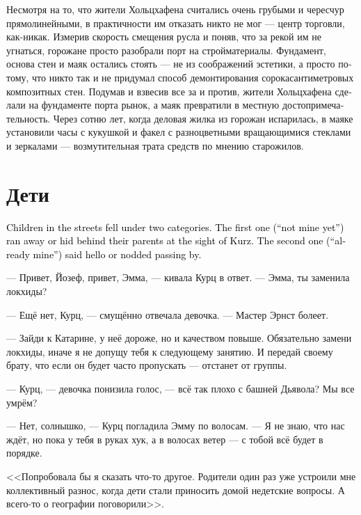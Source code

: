\documentclass[a4paper,12pt,fleqn]{book}\usepackage{cooltooltips}\usepackage{polyglossia}\setdefaultlanguage[babelshorthands=true]{russian}\setotherlanguage{english}\defaultfontfeatures{Ligatures=TeX,Mapping=tex-text} \usepackage{xcolor}\definecolor{lightgray}{HTML}{bbbbbb}\color{lightgray}\newcommand{\ml}[3]{\textenglish{\textcolor{black}{#3}}}
\begin{document}
Несмотря на то, что жители Хольцхафена считались очень грубыми и чересчур прямолинейными, в практичности им отказать никто не мог --- центр торговли, как-никак.
Измерив скорость смещения русла и поняв, что за рекой им не угнаться, горожане просто разобрали порт на стройматериалы.
Фундамент, основа стен и маяк остались стоять --- не из соображений эстетики, а просто потому, что никто так и не придумал способ демонтирования сорокасантиметровых композитных стен.
Подумав и взвесив все за и против, жители Хольцхафена сделали на фундаменте порта рынок, а маяк превратили в местную достопримечательность.
Через сотню лет, когда деловая жилка из горожан испарилась, в маяке установили часы с кукушкой и факел с разноцветными вращающимися стеклами и зеркалами --- возмутительная трата средств по мнению старожилов.

\section{Дети}

\ml{$0$}
{Встреченные на улице дети делились на две категории.}
{Children in the streets fell under two categories.}
\ml{$0$}
{Первая, <<ещё не мои>>, при виде Курц убегали или прятались за родителей.}
{The first one (``not mine yet'') ran away or hid behind their parents at the sight of Kurz.}
\ml{$0$}
{Вторая, <<уже мои>>, здоровались или кивали, проходя мимо.}
{The second one (``already mine'') said hello or nodded passing by.}

--- Привет, Йозеф, привет, Эмма, --- кивала Курц в ответ.
--- Эмма, ты заменила локхиды?

--- Ещё нет, Курц, --- смущённо отвечала девочка.
--- Мастер Эрнст болеет.

--- Зайди к Катарине, у неё дороже, но и качеством повыше.
Обязательно замени локхиды, иначе я не допущу тебя к следующему занятию.
И передай своему брату, что если он будет часто пропускать --- отстанет от группы.

--- Курц, --- девочка понизила голос, --- всё так плохо с башней Дьявола?
Мы все умрём?

--- Нет, солнышко, --- Курц погладила Эмму по волосам.
--- Я не знаю, что нас ждёт, но пока у тебя в руках хук, а в волосах ветер --- с тобой всё будет в порядке.

<<Попробовала бы я сказать что-то другое.
Родители один раз уже устроили мне коллективный разнос, когда дети стали приносить домой недетские вопросы.
А всего-то о географии поговорили>>.
\end{document}
